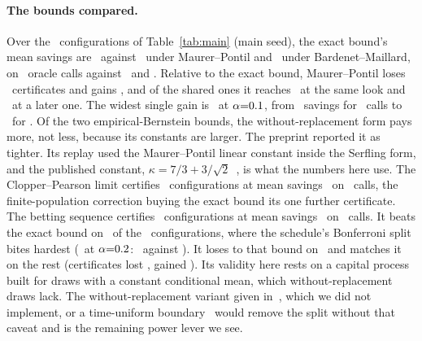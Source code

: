 \paragraph{The bounds compared.} Over the \boundConfigsTotal\
configurations of Table~\ref{tab:main} (main seed), the exact bound's
mean savings are \boundExactSavings\ against \boundEbSavings\ under
Maurer--Pontil and \boundWorSavings\ under Bardenet--Maillard, on
\boundExactOracle\ oracle calls against \boundEbOracle\ and
\boundWorOracle. Relative to
the exact bound, Maurer--Pontil loses \boundEbLost\ certificates
and gains \boundEbExtra, and of the shared ones it reaches
\boundEbSameLook\ at the same look and \boundEbLater\ at a later one.
The widest single gain is \boundGapPair\ at $\alpha{=}0.1$,
from \boundGapEbSavings\ savings for \boundGapEbOracle\ calls
to \boundGapExactSavings\ for \boundGapExactOracle. Of the two
empirical-Bernstein bounds, the without-replacement form pays more,
not less, because its constants are larger. The preprint
reported it as tighter. Its replay used the Maurer--Pontil linear
constant inside the Serfling form, and the published constant,
$\kappa = 7/3 + 3/\sqrt{2}$~\cite{bardenet}, is what the numbers here
use. The Clopper--Pearson limit certifies \boundCpConfigs\ configurations
at mean savings \boundCpSavings\ on \boundCpOracle\ calls, the
finite-population correction buying the exact bound its one further
certificate. The betting sequence certifies
\boundBetConfigs\ configurations at mean savings \boundBetSavings\ on
\boundBetOracle\ calls. It beats the exact bound on \boundBetBetter\ of
the \boundConfigsTotal\ configurations, where the schedule's
Bonferroni split bites hardest (\boundBetOverExactPair\ at
$\alpha{=}0.2$: \boundBetOverExactSavings\ against
\boundBetOverExactExactSavings). It loses to that bound on \boundBetWorse\ and
matches it on the rest (certificates
lost \boundBetLost, gained \boundBetExtra). Its validity here rests
on a capital process built for draws with a constant conditional mean,
which without-replacement draws lack. The
without-replacement variant given in~\cite{wsr}, which we did not
implement, or a time-uniform boundary~\cite{howard} would remove
the split without that caveat and is the remaining power lever we see.

